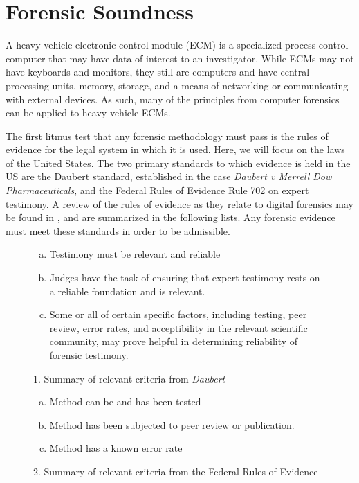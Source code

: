 \section{Forensic Soundness}

A heavy vehicle electronic control module (ECM) is a specialized process control computer that may have data of interest to an investigator. 
While ECMs may not have keyboards and monitors, they still are computers and have central processing units, memory, storage, and a means of 
networking or communicating with external devices. As such, many of the principles from computer forensics can be applied to heavy vehicle ECMs.

The first litmus test that any forensic methodology must pass is the rules of evidence for the legal system in which it is used. Here, we will
focus on the laws of the United States. The two primary standards to which evidence is held in the US are the Daubert standard, established
in the case \emph{Daubert v Merrell Dow Pharmaceuticals}\cite{Daubert1993}, and the Federal Rules of Evidence Rule 702 on expert testimony\cite{FedRules702}. 
A review of the rules of evidence as they relate to 
digital forensics may be found in \cite{meyers2005}, and are summarized in the following lists. Any forensic
evidence must meet these standards in order to be admissible.

\begin{figure}[h]
\caption*{1. Summary of relevant criteria from \emph{Daubert}}
\begin{enumerate}[(a)]
  \item Testimony must be relevant and reliable
  \item Judges have the task of ensuring that expert testimony rests on a reliable
        foundation and is relevant.
  \item Some or all of certain specific factors, including testing, peer review, error
        rates, and acceptibility in the relevant scientific community, may prove helpful
        in determining reliability of forensic testimony.
\end{enumerate}

\label{fig:ch1daubert}
\end{figure}

\begin{figure}[h]
  \centering
  \caption*{2. Summary of relevant criteria from the Federal Rules of Evidence}
\begin{enumerate}[(a)]
  \item Method can be and has been tested
  \item Method has been subjected to peer review or publication.
  \item Method has a known error rate
\end{enumerate}

\label{ref:ch1fed}
\end{figure}

